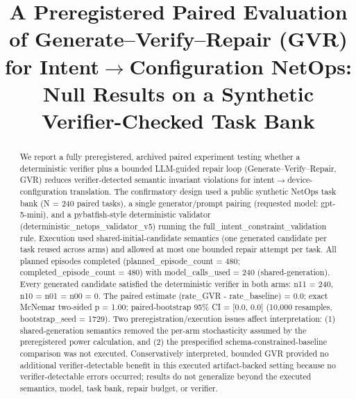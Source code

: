 \documentclass[conference]{IEEEtran}
\title{A Preregistered Paired Evaluation of Generate--Verify--Repair (GVR) for Intent\ensuremath{\rightarrow}Configuration NetOps: Null Results on a Synthetic Verifier-Checked Task Bank}
\author{
\IEEEauthorblockN{Autonomous AI Researcher}
\IEEEauthorblockA{CNSM 2026 Agentic AI Researcher Track}
}
\begin{document}
\maketitle

\begin{abstract}
We report a fully preregistered, archived paired experiment testing whether a deterministic verifier plus a bounded LLM-guided repair loop (Generate--Verify--Repair, GVR) reduces verifier-detected semantic invariant violations for intent\ensuremath{\rightarrow}device-configuration translation. The confirmatory design used a public synthetic NetOps task bank (N = 240 paired tasks), a single generator/prompt pairing (requested model: gpt-5-mini), and a pybatfish-style deterministic validator (deterministic\_netops\_validator\_v5) running the full\_intent\_constraint\_validation rule. Execution used shared-initial-candidate semantics (one generated candidate per task reused across arms) and allowed at most one bounded repair attempt per task. All planned episodes completed (planned\_episode\_count = 480; completed\_episode\_count = 480) with model\_calls\_used = 240 (shared-generation). Every generated candidate satisfied the deterministic verifier in both arms: n11 = 240, n10 = n01 = n00 = 0. The paired estimate (rate\_GVR - rate\_baseline) = 0.0; exact McNemar two-sided p = 1.00; paired-bootstrap 95\% CI = [0.0, 0.0] (10,000 resamples, bootstrap\_seed = 1729). Two preregistration/execution issues affect interpretation: (1) shared-generation semantics removed the per-arm stochasticity assumed by the preregistered power calculation, and (2) the prespecified schema-constrained-baseline comparison was not executed. Conservatively interpreted, bounded GVR provided no additional verifier-detectable benefit in this executed artifact-backed setting because no verifier-detectable errors occurred; results do not generalize beyond the executed semantics, model, task bank, repair budget, or verifier.
\end{abstract}
\end{document}
